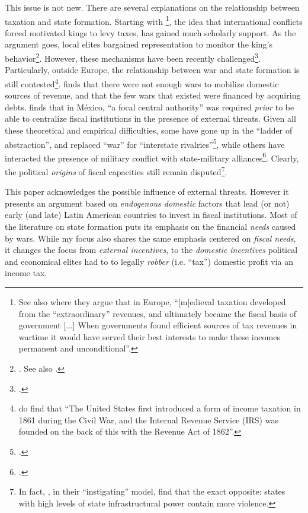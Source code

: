 \documentclass[onesided]{article}\usepackage[]{graphicx}\usepackage[]{color}
\begin{document}
This issue is not new. There are several explanations on the relationship between taxation and state formation. Starting with \citet{Tilly:1992rr}\footnote{See also \citet[p. 162, 170]{Ames1977} where they argue that in Europe, ``[m]edieval taxation developed from the ``extraordinary'' revenues, and ultimately became the fiscal basis of government [...] When governments found efficient sources of tax revenues in wartime it would have served their best interests to make these incomes permanent and unconditional''.}, the idea that international conflicts forced motivated kings to levy taxes, has gained much scholarly support. As the argument goes, local elites bargained representation to monitor the king's behavior\footnote{
	\citet{Stasavage:2011aa}. See also \citet{Levi:1989lq}.
	}. However, these mechanisms have been recently challenged\footnote{
		\citet{Boucoyannis2015}.}. Particularly, outside Europe, the relationship between war and state formation is still contested\footnote{
		\citet[p. 1218]{Besley2009} do find that ``The United States first introduced a form of income taxation in 1861 during the Civil War, and the Internal Revenue Service (IRS) was founded on the back of this with the Revenue Act of 1862''.
		}. \citet{Centeno:2002qf} finds that there were not enough wars to mobilize domestic sources of revenue, and that the few wars that existed were financed by acquiring debts. \citet[p. 665]{Arias2012} finds that in M\'exico, ``a focal central authority'' was required \emph{prior} to be able to centralize fiscal institutions in the presence of external threats. Given all these theoretical and empirical difficulties, some have gone up in the ``ladder of abstraction'', and replaced ``war'' for ``interstate rivalries''\footnote{\citet[]{Thies2005a}.}, while others have interacted the presence of military conflict with state-military alliances\footnote{\citet[p.  37]{Lopez-Alves:2000zl}.}. Clearly, the political  \emph{origins} of fiscal capacities still remain disputed\footnote{In fact, \citet[p. 314]{Lange2008}, in their ``instigating'' model, find that the exact opposite: states with high levels of state infrastructural power contain more violence.
		}.

This paper acknowledges the possible influence of external threats. However it presents an argument based on \emph{endogenous domestic} factors that lead (or not) early (and late) Latin American countries to invest in fiscal institutions. Most of the literature on state formation puts its emphasis on the financial \emph{needs} caused by wars. While my focus also shares the same emphasis centered on \emph{fiscal needs}, it changes the focus from \emph{external incentives}, to the \emph{domestic incentives} political and economical elites had to to legally \emph{robber} (i.e. ``tax'') domestic profit via an income tax.
\end{document}
